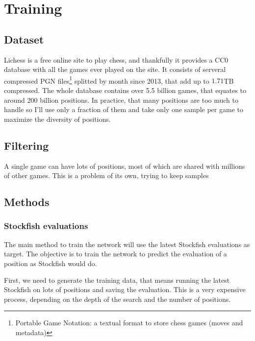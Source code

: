 \section{Training}



\subsection{Dataset}

Lichess is a free online site to play chess, and thankfully it provides a CC0 database \cite{lichessdb} with all the games ever played on the site. It consists of serveral compressed PGN files\footnote{Portable Game Notation: a textual format to store chess games (moves and metadata)} splitted by month since 2013, that add up to $1.71$TB compressed. The whole database contains over 5.5 billion games, that equates to around 200 billion positions. In practice, that many positions are too much to handle so I'll use only a fraction of them and take only one sample per game to maximize the diversity of positions.


\subsection{Filtering}

A single game can have lots of positions, most of which are shared with millions of other games. This is a problem of its own, trying to keep samples 


\subsection{Methods}



\subsubsection{Stockfish evaluations}

The main method to train the network will use the latest Stockfish evaluations as target. The objective is to train the network to predict the evaluation of a position as Stockfish would do.

First, we need to generate the training data, that means running the latest Stockfish on lots of positions and saving the evaluation. This is a very expensive process, depending on the depth of the search and the number of positions.


